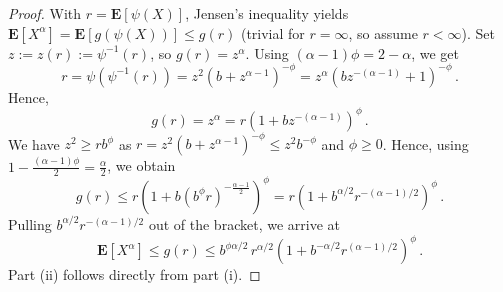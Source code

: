 \documentclass{article}
\newcommand{\lab}{\left[} %
\newcommand{\rab}{\right]} %
\newcommand{\ab}[1]{\lab #1 \rab} %
\newcommand{\abOf}[1]{\!\ab{#1}} %
\newcommand{\lb}{\left(} %
\newcommand{\rb}{\right)} %
\newcommand{\br}[1]{\lb #1 \rb} %
\newcommand{\E}{\mathbf{E}} %
\newcommand{\Eof}[1]{\E[#1]}
\newcommand{\EOf}[1]{\E\abOf{#1}}
\newcommand{\eqfs}{\,.}
\begin{document}
\begin{proof}
    \underline{} 
    With $r = \EOf{\psi(X)}$, Jensen's inequality yields $\Eof{X^\alpha} = \Eof{g(\psi(X))} \leq g(r)$ (trivial for $r = \infty$, so assume $r < \infty$). 
    Set $z := z(r) := \psi^{-1}(r)$, so $g(r)=z^\alpha$. Using $(\alpha-1)\phi=2-\alpha$,
    we get
    \begin{equation}
        r
        =
        \psi(\psi^{-1}(r))
        =
        z^2(b + z^{\alpha-1})^{-\phi}
        =
        z^{\alpha}\br{b z^{-(\alpha-1)} + 1}^{-\phi}
        \eqfs
    \end{equation}
    Hence,
    \begin{equation}
        g(r) = 
        z^\alpha
        =
        r\br{1+b z^{-(\alpha-1)}}^{\phi}
        \eqfs
    \end{equation}
    We have $z^2 \geq r b^\phi$ as $r=z^2(b+z^{\alpha-1})^{-\phi}\leq z^2 b^{-\phi}$ and $\phi\geq0$.
    Hence, using $1-\tfrac{(\alpha-1)\phi}{2}=\tfrac\alpha2$, we obtain
    \begin{equation}
        g(r)
        \leq 
        r\br{1+b\br{b^{\phi}r}^{-\frac{\alpha-1}2}}^{\phi}
        =
        r\br{1+b^{\alpha/2}r^{-(\alpha-1)/2}}^{\phi}
        \eqfs
    \end{equation}
    Pulling $b^{\alpha/2}r^{-(\alpha-1)/2}$ out of the bracket, we arrive at
    \begin{equation}
        \EOf{X^\alpha}
        \leq 
        g(r)
        \leq 
        b^{\phi\alpha/2}\,r^{\alpha/2}\br{1+b^{-\alpha/2}r^{(\alpha-1)/2}}^{\phi}
        \eqfs
    \end{equation}
    Part (ii) follows directly from part (i).
\end{proof}
\end{document}
